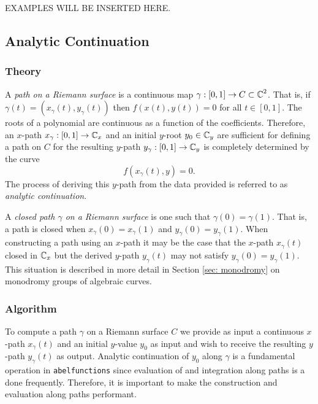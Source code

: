 \vspace{24pt}

EXAMPLES WILL BE INSERTED HERE.

\vspace{24pt}


\subsection{Analytic Continuation} \label{sec: analytic-continuation}

%
\subsubsection*{Theory}
%

A {\it path on a Riemann surface} is a continuous map $\gamma : [0,1]
\to C \subset \operatorname{\mathbb{C}}^2$. That is, if $\gamma(t) = (x_\gamma(t),
y_\gamma(t))$ then $f(x(t),y(t)) = 0$ for all $t \in [0,1]$. The roots
of a polynomial are continuous as a function of the
coefficients. Therefore, an $x$-path $x_\gamma : [0,1] \to \operatorname{\mathbb{C}}_x$ and an
initial $y$-root $y_0 \in \operatorname{\mathbb{C}}_y$ are sufficient for defining a path on
$C$ for the resulting $y$-path $y_\gamma : [0,1] \to \operatorname{\mathbb{C}}_y$ is
completely determined by the curve
\[
    f(x_\gamma(t),y) = 0.
\]
The process of deriving this $y$-path from the data provided is
referred to as {\it analytic continuation}.

A {\it closed path $\gamma$ on a Riemann surface} is one such that
$\gamma(0) = \gamma(1)$. That is, a path is closed when $x_\gamma(0) =
x_\gamma(1)$ and $y_\gamma(0) = y_\gamma(1)$. When constructing a path
using an $x$-path it may be the case that the $x$-path $x_\gamma(t)$
closed in $\operatorname{\mathbb{C}}_x$ but the derived $y$-path $y_\gamma(t)$ may not satisfy
$y_\gamma(0) = y_\gamma(1)$. This situation is described in more detail
in Section \ref{sec: monodromy} on monodromy groups of algebraic curves.

%
\subsubsection*{Algorithm}
%

To compute a path $\gamma$ on a Riemann surface $C$ we provide as input
a continuous $x$-path $x_\gamma(t)$ and an initial $y$-value $y_0$ as
input and wish to receive the resulting $y$-path $y_\gamma(t)$ as
output. Analytic continuation of $y_0$ along $\gamma$ is a fundamental
operation in {\tt abelfunctions} since evaluation of and integration
along paths is a done frequently. Therefore, it is important to make the
construction and evaluation along paths performant.

